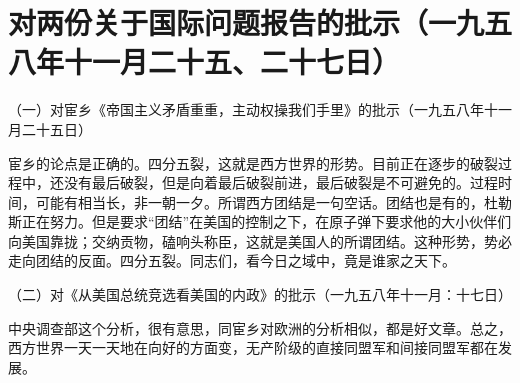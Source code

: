 \section[对两份关于国际问题报告的批示（一九五八年十一月二十五、二十七日）]{对两份关于国际问题报告的批示（一九五八年十一月二十五、二十七日）}


（一）对宦乡《帝国主义矛盾重重，主动权操我们手里》的批示（一九五八年十一月二十五日）

宦乡的论点是正确的。四分五裂，这就是西方世界的形势。目前正在逐步的破裂过程中，还没有最后破裂，但是向着最后破裂前进，最后破裂是不可避免的。过程时间，可能有相当长，非一朝一夕。所谓西方团结是一句空话。团结也是有的，杜勒斯正在努力。但是要求“团结”在美国的控制之下，在原子弹下要求他的大小伙伴们向美国靠拢；交纳贡物，磕响头称臣，这就是美国人的所谓团结。这种形势，势必走向团结的反面。四分五裂。同志们，看今日之域中，竟是谁家之天下。

（二）对《从美国总统竞选看美国的内政》的批示（一九五八年十一月：十七日）

中央调查部这个分析，很有意思，同宦乡对欧洲的分析相似，都是好文章。总之，西方世界一天一天地在向好的方面变，无产阶级的直接同盟军和间接同盟军都在发展。


